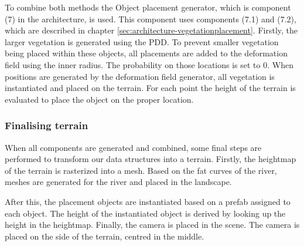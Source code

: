 To combine both methods the Object placement generator, which is component (7) in the architecture, is used. This component uses components (7.1) and (7.2), which are described in chapter \ref{sec:architecture-vegetationplacement}. Firstly, the larger vegetation is generated using the PDD. To prevent smaller vegetation being placed within these objects, all placements are added to the deformation field using the inner radius. The probability on those locations is set to 0. When positions are generated by the deformation field generator, all vegetation is instantiated and placed on the terrain. For each point the height of the terrain is evaluated to place the object on the proper location.

\subsubsection{Finalising terrain}
When all components are generated and combined, some final steps are performed to transform our data structures into a terrain. Firstly, the heightmap of the terrain is rasterized into a mesh. Based on the fat curves of the river, meshes are generated for the river and placed in the landscape.

After this, the placement objects are instantiated based on a prefab assigned to each object. The height of the instantiated object is derived by looking up the height in the heightmap.
Finally, the camera is placed in the scene. The camera is placed on the side of the terrain, centred in the middle.
